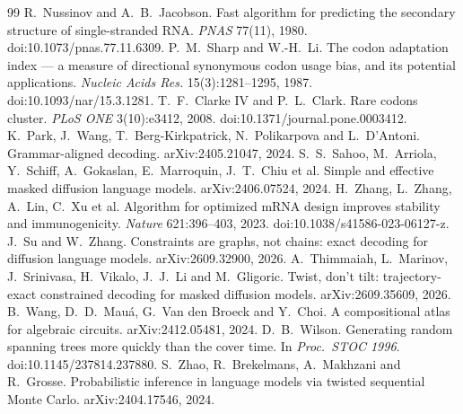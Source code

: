 \documentclass[11pt]{article}
\theoremstyle{definition}
\begin{document}
\begin{thebibliography}{99}
 R.~Nussinov and A.~B.~Jacobson. Fast algorithm for predicting the secondary structure of single-stranded RNA. \emph{PNAS} 77(11), 1980. doi:10.1073/pnas.77.11.6309.
 P.~M.~Sharp and W.-H.~Li. The codon adaptation index --- a measure of directional synonymous codon usage bias, and its potential applications. \emph{Nucleic Acids Res.} 15(3):1281--1295, 1987. doi:10.1093/nar/15.3.1281.
 T.~F.~Clarke IV and P.~L.~Clark. Rare codons cluster. \emph{PLoS ONE} 3(10):e3412, 2008. doi:10.1371/journal.pone.0003412.
 K.~Park, J.~Wang, T.~Berg-Kirkpatrick, N.~Polikarpova and L.~D'Antoni. Grammar-aligned decoding. arXiv:2405.21047, 2024.
 S.~S.~Sahoo, M.~Arriola, Y.~Schiff, A.~Gokaslan, E.~Marroquin, J.~T.~Chiu et al. Simple and effective masked diffusion language models. arXiv:2406.07524, 2024.
 H.~Zhang, L.~Zhang, A.~Lin, C.~Xu et al. Algorithm for optimized mRNA design improves stability and immunogenicity. \emph{Nature} 621:396--403, 2023. doi:10.1038/s41586-023-06127-z.
 J.~Su and W.~Zhang. Constraints are graphs, not chains: exact decoding for diffusion language models. arXiv:2609.32900, 2026.
 A.~Thimmaiah, L.~Marinov, J.~Srinivasa, H.~Vikalo, J.~J.~Li and M.~Gligoric. Twist, don't tilt: trajectory-exact constrained decoding for masked diffusion models. arXiv:2609.35609, 2026.
 B.~Wang, D.~D.~Mau\'a, G.~Van den Broeck and Y.~Choi. A compositional atlas for algebraic circuits. arXiv:2412.05481, 2024.
 D.~B.~Wilson. Generating random spanning trees more quickly than the cover time. In \emph{Proc.\ STOC 1996}. doi:10.1145/237814.237880.
 S.~Zhao, R.~Brekelmans, A.~Makhzani and R.~Grosse. Probabilistic inference in language models via twisted sequential Monte Carlo. arXiv:2404.17546, 2024.
\end{thebibliography}
\end{document}
